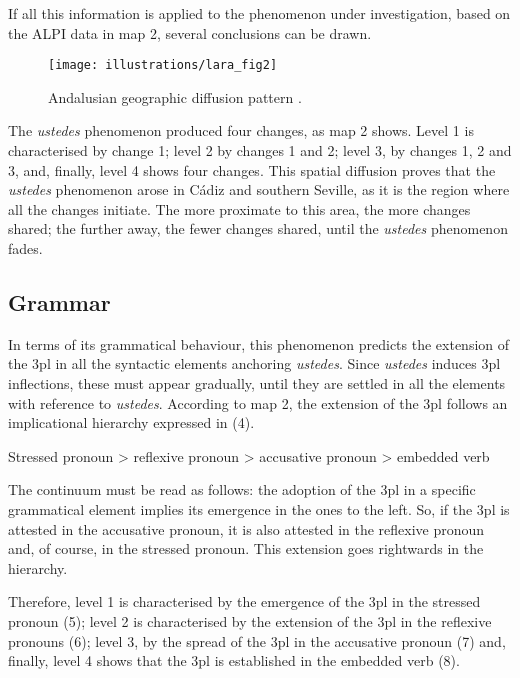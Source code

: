 \documentclass[output=paper]{LSP/langsci}
\begin{document}
If all this information is applied to the phenomenon under investigation, based on the ALPI data in map 2, several conclusions can be drawn.

\begin{figure}
\texttt{[image: illustrations/lara\_fig2]}
 \caption{Andalusian geographic diffusion pattern \citep[85]{lara_ustedes_2012}.}
\end{figure}

The \textit{ustedes} phenomenon produced four changes, as map 2 shows. Level 1 is characterised by change 1; level 2 by changes 1 and 2; level 3, by changes 1, 2 and 3, and, finally, level 4 shows four changes. This spatial diffusion proves that the \textit{ustedes} phenomenon arose in Cádiz and southern Seville, as it is the region where all the changes initiate. The more proximate to this area, the more changes shared; the further away, the fewer changes shared, until the \textit{ustedes} phenomenon fades. 

\subsection{Grammar}
In terms of its grammatical behaviour, this phenomenon predicts the extension of the 3pl in all the syntactic elements anchoring \textit{ustedes}. Since \textit{ustedes} induces 3pl inflections, these must appear gradually, until they are settled in all the elements with reference to \textit{ustedes}. According to map 2, the extension of the 3pl follows an implicational hierarchy expressed in (4).

\begin{exe}
\ex Stressed pronoun {\textgreater} reflexive pronoun {\textgreater} accusative pronoun {\textgreater} embedded verb
\end{exe}

The continuum must be read as follows: the adoption of the 3pl in a specific grammatical element implies its emergence in the ones to the left. So, if the 3pl is attested in the accusative pronoun, it is also attested in the reflexive pronoun and, of course, in the stressed pronoun. This extension goes rightwards in the hierarchy.

Therefore, level 1 is characterised by the emergence of the 3pl in the stressed pronoun (5); level 2 is characterised by the extension of the 3pl in the reflexive pronouns (6); level 3, by the spread of the 3pl in the accusative pronoun (7) and, finally, level 4 shows that the 3pl is established in the embedded verb (8).
\end{document}
